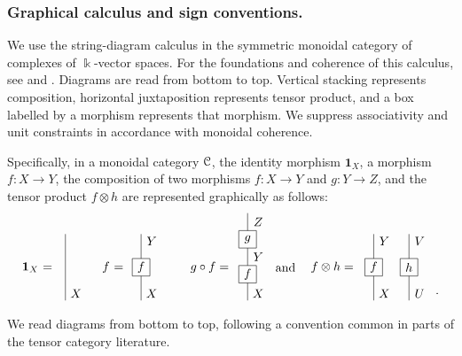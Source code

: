 \documentclass[a4paper, 11pt]{amsart}
\theoremstyle{definition}
\theoremstyle{remark}
\numberwithin{equation}{section}
\newcommand{\id}{\mathbf{1}}
\newcommand{\EC}{\EuScript{C}}
\begin{document}
\subsubsection*{Graphical calculus and sign conventions.}
We use the string-diagram calculus in the symmetric monoidal category
of complexes of $\Bbbk$-vector spaces. For the foundations and
coherence of this calculus, see \cite{JS91,Sel11} and
\cite[Chapter 2]{TV17}. Diagrams are read from bottom to top.
Vertical stacking represents composition, horizontal juxtaposition represents tensor product, and a box labelled by a morphism represents that morphism. 
We suppress associativity and unit constraints in
accordance with monoidal coherence. 

Specifically, in a monoidal category $\EC$, the identity morphism $\id_X$, a morphism $f:X\rightarrow Y$, the composition of two morphisms $f:X\rightarrow Y$ and $g: Y\rightarrow Z$, and the tensor product $f\otimes h$ are represented graphically as follows:
\[\begin{tikzpicture}
\draw (0, 0) --(0, 1.9);
\node at (.3, .2) {$X$};
\node at (-.8, .95) {$\id_X$ =};
\end{tikzpicture}
\quad
\begin{tikzpicture}
\draw (0, 0) --(0, .7);
\node at (.3, .2) {$X$};
\node at (.3, 1.7) {$Y$};

\draw (-.25, .7) rectangle (.25, 1.2);
\node at (0, .95) {$f$};
\node at (-.8, .95) {$f$ =};

\draw (0, 1.2) --(0, 1.9);
\end{tikzpicture}
\qquad
\begin{tikzpicture}
\draw (0, -.3) --(0, .2);
\draw (-.25, .2) rectangle (.25, .7);
\node at (0, .45) {$f$};
\draw (0, .7) --(0, 1.2);
\draw (-.25, 1.2) rectangle (.25, 1.7);
\node at (0, 1.45) {$g$};
\draw (0, 1.7) --(0, 2.2);
\node at (.3, -.1) {$X$};
\node at (.3, .95) {$Y$};
\node at (.3, 1.95) {$Z$};
\node at (-.9, .65) {$g\circ f=\quad$};
\end{tikzpicture}
\;
\begin{tikzpicture}
\draw (-1, 0) --(-1, .7);
\draw (-1.25, .7) rectangle (-.75, 1.2);
\node at (-1, .95) {$f$};
\draw (-1, 1.2) --(-1, 1.9);
\draw (0, 0) --(0, .7);
\node at (-.7, .2) {$X$};
\node at (-.7, 1.7) {$Y$};
\node at (.3, .2) {$U$};
\node at (.3, 1.7) {$V$};
\node at (-3.5, .95) {and};

\node at (-2, .95) {$f\otimes h= \quad$};

\draw (-.25, .7) rectangle (.25, 1.2);
\node at (0, .95) {$h$};
\node at (.8, .2) {.};

\draw (0, 1.2) --(0, 1.9);
\end{tikzpicture}
\]
We read diagrams from bottom to top, following a convention common in parts of the tensor category literature.
\end{document}
